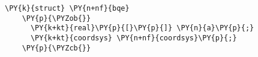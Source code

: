 \begin{Verbatim}[commandchars=\\\{\}]
    \PY{k}{struct} \PY{n+nf}{bqe}
    \PY{p}{\PYZob{}}
      \PY{k+kt}{real}\PY{p}{[}\PY{p}{]} \PY{n}{a}\PY{p}{;}
      \PY{k+kt}{coordsys} \PY{n+nf}{coordsys}\PY{p}{;}
    \PY{p}{\PYZcb{}}
\end{Verbatim}
